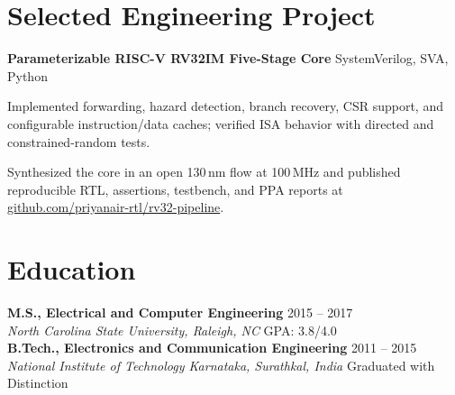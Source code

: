 \documentclass[10pt,letterpaper]{article}
\newcommand{\project}[2]{%
  \textbf{\color{siliconnavy}#1} \hfill {\small\color{textgray}#2}\par
}
\begin{document}
\section*{Selected Engineering Project}
\project{Parameterizable RISC-V RV32IM Five-Stage Core}{SystemVerilog, SVA, Python}
\begin{compactitem}
  \item Implemented forwarding, hazard detection, branch recovery, CSR support, and configurable instruction/data caches; verified ISA behavior with directed and constrained-random tests.
  \item Synthesized the core in an open 130\,nm flow at 100\,MHz and published reproducible RTL, assertions, testbench, and PPA reports at \href{https://github.com/priyanair-rtl/rv32-pipeline}{github.com/priyanair-rtl/rv32-pipeline}.
\end{compactitem}

\section*{Education}
\textbf{M.S., Electrical and Computer Engineering} \hfill {\small 2015 -- 2017}\\[-1pt]
\textit{North Carolina State University, Raleigh, NC} \hfill {\small\color{textgray}GPA: 3.8/4.0}\\[1pt]
\textbf{B.Tech., Electronics and Communication Engineering} \hfill {\small 2011 -- 2015}\\[-1pt]
\textit{National Institute of Technology Karnataka, Surathkal, India} \hfill {\small\color{textgray}Graduated with Distinction}
\end{document}
